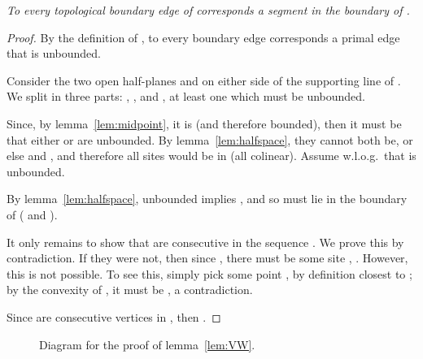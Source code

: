 \documentclass[11pt]{article}
\begin{document}
\emph{	To every topological boundary edge of  corresponds a segment in the boundary of .
}
\begin{proof}
By the definition of , 
to every boundary edge  corresponds a primal edge 
that is unbounded. 


Consider the two open half-planes  and  on either
side of the supporting line  of . 
We split  in three parts: , , and , 
	at least one which must be unbounded. 
	
Since, by lemma~\ref{lem:midpoint}, it is  (and therefore bounded), 
	then it must be that either  or  are unbounded. 
By lemma~\ref{lem:halfspace}, they cannot both be, or else 
 and , and therefore all sites
would be in  (all colinear). 
Assume w.l.o.g.\  that  is unbounded. 

By lemma~\ref{lem:halfspace},  unbounded implies 
, and 
so  must lie in the boundary of  
( and ). 


It only remains to show that  are consecutive in the sequence . 
We prove this by contradiction. 
If they were not, then since , 
there must be some site , . 
However, this is not possible. 
To see this, simply pick some point , by definition closest to ;
 by the convexity of , it must be , a contradiction. 

Since  are consecutive vertices in , then 
. 
\end{proof}







\begin{figure}
\centering
{}
\quad\quad
{}
\label{fig:VW}
\caption{Diagram for the proof of lemma~\ref{lem:VW}.}
\end{figure}
\end{document}

